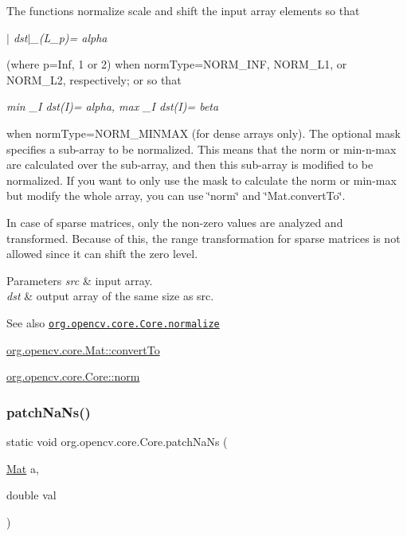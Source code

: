 The functions {\ttfamily normalize} scale and shift the input array elements so that

{\itshape $\vert$ dst$\vert$\+\_\+(L\+\_\+p)= alpha}

(where p=Inf, 1 or 2) when {\ttfamily norm\+Type=N\+O\+R\+M\+\_\+\+I\+NF}, {\ttfamily N\+O\+R\+M\+\_\+\+L1}, or {\ttfamily N\+O\+R\+M\+\_\+\+L2}, respectively; or so that

{\itshape min \+\_\+I dst(\+I)= alpha, max \+\_\+I dst(\+I)= beta}

when {\ttfamily norm\+Type=N\+O\+R\+M\+\_\+\+M\+I\+N\+M\+AX} (for dense arrays only). The optional mask specifies a sub-\/array to be normalized. This means that the norm or min-\/n-\/max are calculated over the sub-\/array, and then this sub-\/array is modified to be normalized. If you want to only use the mask to calculate the norm or min-\/max but modify the whole array, you can use \char`\"{}norm\char`\"{} and \char`\"{}\+Mat.\+convert\+To\char`\"{}.

In case of sparse matrices, only the non-\/zero values are analyzed and transformed. Because of this, the range transformation for sparse matrices is not allowed since it can shift the zero level.


\begin{DoxyParams}{Parameters}
{\em src} & input array. \\
\hline
{\em dst} & output array of the same size as {\ttfamily src}.\\
\hline
\end{DoxyParams}
\begin{DoxySeeAlso}{See also}
\href{http://docs.opencv.org/modules/core/doc/operations_on_arrays.html#normalize}{\tt org.\+opencv.\+core.\+Core.\+normalize} 

\mbox{\hyperlink{classorg_1_1opencv_1_1core_1_1_mat_aa783d679e1b68aa5f9da6434be761eb7}{org.\+opencv.\+core.\+Mat\+::convert\+To}} 

\mbox{\hyperlink{classorg_1_1opencv_1_1core_1_1_core_a282aac8c7806f10f75738bf8db3af7a8}{org.\+opencv.\+core.\+Core\+::norm}} 
\end{DoxySeeAlso}
\mbox{\label{classorg_1_1opencv_1_1core_1_1_core_ab0dae7a8f13b75f48d05b12fc327009a}} 
\subsubsection{\texorpdfstring{patch\+Na\+Ns()}{patchNaNs()}\hspace{0.1cm}{\footnotesize\ttfamily [1/2]}}
{\footnotesize\ttfamily static void org.\+opencv.\+core.\+Core.\+patch\+Na\+Ns (\begin{DoxyParamCaption}\item[{\mbox{\hyperlink{classorg_1_1opencv_1_1core_1_1_mat}{Mat}}}]{a,  }\item[{double}]{val }\end{DoxyParamCaption})\hspace{0.3cm}{\ttfamily [static]}}

